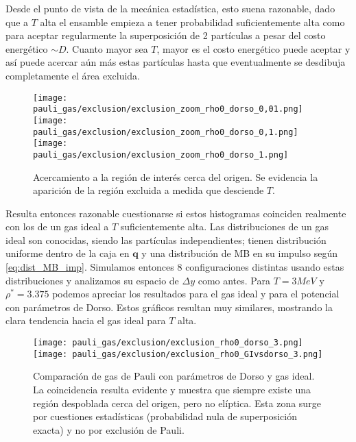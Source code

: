 Desde el punto de vista de la mecánica estadística, esto suena razonable, dado que a $T$ alta el ensamble empieza a tener probabilidad suficientemente alta como para
aceptar regularmente la superposición de 2 partículas a pesar del costo energético $\sim D$.
Cuanto mayor sea $T$, mayor es el costo energético puede aceptar y así puede acercar aún más estas partículas hasta que eventualmente se desdibuja completamente el área excluida.


\begin{figure}[H]
	\centering	%
	\texttt{[image: pauli\_gas/exclusion/exclusion\_zoom\_rho0\_dorso\_0,01.png]}
	\texttt{[image: pauli\_gas/exclusion/exclusion\_zoom\_rho0\_dorso\_0,1.png]}
	\texttt{[image: pauli\_gas/exclusion/exclusion\_zoom\_rho0\_dorso\_1.png]}
	\caption{Acercamiento a la región de interés cerca del origen. Se evidencia la aparición de la región excluida a medida que desciende $T$.}
	\label{fig:exclusion_zoom_rho0_dorso}
\end{figure}

Resulta entonces razonable cuestionarse si estos histogramas coinciden realmente con los de un gas ideal a $T$ suficientemente alta.
Las distribuciones de un gas ideal son conocidas, siendo las partículas independientes; tienen distribución uniforme dentro de la caja en $\mathbf{q}$ y una
distribución de MB en su impulso según \eqref{eq:dist_MB_imp}.
Simulamos entonces 8 configuraciones distintas usando estas distribuciones y analizamos su espacio de $\Delta y$ como antes.
Para $T=3MeV$ y $\rho^*=3.375$ podemos apreciar los resultados para el gas ideal y para el potencial con parámetros de Dorso.
Estos gráficos resultan muy similares, mostrando la clara tendencia hacia el gas ideal para $T$ alta.

\begin{figure}[H]
	\centering	%
	\texttt{[image: pauli\_gas/exclusion/exclusion\_rho0\_dorso\_3.png]}
	\texttt{[image: pauli\_gas/exclusion/exclusion\_rho0\_GIvsdorso\_3.png]}
	\caption{Comparación de gas de Pauli con parámetros de Dorso y gas ideal.
    La coincidencia resulta evidente y muestra que siempre existe una región despoblada cerca del origen, pero no elíptica.
    Esta zona surge por cuestiones estadísticas (probabilidad nula de superposición exacta) y no por exclusión de Pauli.}
	\label{fig:exclusion_dorso_vs_GI}
\end{figure}

